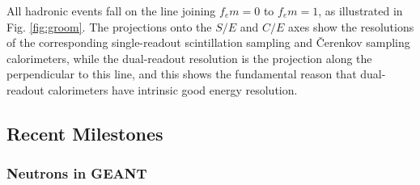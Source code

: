 All hadronic events fall on the line joining $f_em=0$ to $f_em=1$, as illustrated in Fig. \ref{fig:groom}.  The projections 
onto the $S/E$ and $C/E$   axes show the resolutions of the corresponding single-readout scintillation sampling and \v{C}er\-enk\-ov sampling calorimeters, while the dual-readout resolution is the projection along the perpendicular to this line, and
  this shows the fundamental reason that dual-readout calorimeters have intrinsic good energy resolution.






\subsection{Recent Milestones}

\subsubsection{Neutrons in GEANT}            \label{sec:geant}  


